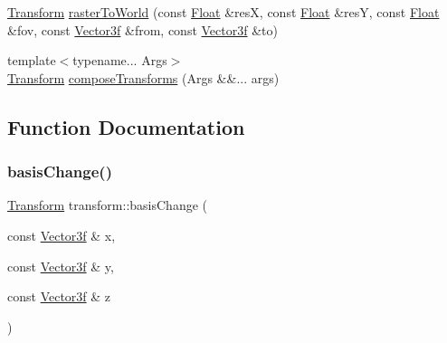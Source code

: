\begin{DoxyCompactItemize}
\item 
\mbox{\hyperlink{classtransform_1_1Transform}{Transform}} \mbox{\hyperlink{namespacetransform_a6d009baa6f7b018a5f0d31a864380ec6}{raster\+To\+World}} (const \mbox{\hyperlink{cyclop_8hpp_a07afd7094cb489cbd514c76e6f55d34f}{Float}} \&resX, const \mbox{\hyperlink{cyclop_8hpp_a07afd7094cb489cbd514c76e6f55d34f}{Float}} \&resY, const \mbox{\hyperlink{cyclop_8hpp_a07afd7094cb489cbd514c76e6f55d34f}{Float}} \&fov, const \mbox{\hyperlink{cyclop_8hpp_a5a0a2e85b081623ef3f7e7e8d43024f5}{Vector3f}} \&from, const \mbox{\hyperlink{cyclop_8hpp_a5a0a2e85b081623ef3f7e7e8d43024f5}{Vector3f}} \&to)
\item 
{\footnotesize template$<$typename... Args$>$ }\\\mbox{\hyperlink{classtransform_1_1Transform}{Transform}} \mbox{\hyperlink{namespacetransform_a05a73ff0bc36879c17e55dd4d8f4f3d6}{compose\+Transforms}} (Args \&\&... args)
\end{DoxyCompactItemize}


\subsection{Function Documentation}
\mbox{\label{namespacetransform_ae8b8abac3c9545a9638557d140253085}} 
\subsubsection{\texorpdfstring{basisChange()}{basisChange()}}
{\footnotesize\ttfamily \mbox{\hyperlink{classtransform_1_1Transform}{Transform}} transform\+::basis\+Change (\begin{DoxyParamCaption}\item[{const \mbox{\hyperlink{cyclop_8hpp_a5a0a2e85b081623ef3f7e7e8d43024f5}{Vector3f}} \&}]{x,  }\item[{const \mbox{\hyperlink{cyclop_8hpp_a5a0a2e85b081623ef3f7e7e8d43024f5}{Vector3f}} \&}]{y,  }\item[{const \mbox{\hyperlink{cyclop_8hpp_a5a0a2e85b081623ef3f7e7e8d43024f5}{Vector3f}} \&}]{z }\end{DoxyParamCaption})}

\mbox{\label{namespacetransform_a3702053b4e20d89c0347d504ea013e15}} 
